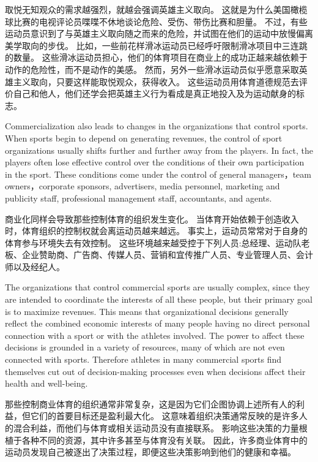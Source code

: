 \documentclass[cs4size, a4paper, 12pt]{article}
\newcounter{numpar}
\newcommand*{\newpar}{\numpar{}}
\begin{document}
	取悦无知观众的需求越强烈，就越会强调英雄主义取向。 这就是为什么美国橄榄球比赛的电视评论员喋喋不休地谈论危险、受伤、带伤比赛和胆量。 不过，有些运动员意识到了与英雄主义取向随之而来的危险，并试图在他们的运动中放慢偏离美学取向的步伐。 比如，一些前花样滑冰运动员已经呼吁限制滑冰项目中三连跳的数量。 这些滑冰运动员担心，他们的体育项目在商业上的成功正越来越依赖于动作的危险性，而不是动作的美感。 然而，另外一些滑冰运动员似乎愿意采取英雄主义取向，只要这样能取悦观众，获得收入。 这些运动员用体育道德规范去评价自己和他人，他们还学会把英雄主义行为看成是真正地投入及为运动献身的标志。 
	
	\newpar Commercialization also leads to changes in the organizations that control sports. When sports begin to depend on generating revenues, the control of sport organizations usually shifts further and further away from the players. In fact, the players often lose effective control over the conditions of their own participation in the sport. These conditions come under the control of general managers，team owners，corporate sponsors, advertisers, media personnel, marketing and publicity staff, professional management staff, accountants, and agents.
	
	商业化同样会导致那些控制体育的组织发生变化。 当体育开始依赖于创造收入时，体育组织的控制权就会离运动员越来越远。 事实上，运动员常常对于自身的体育参与环境失去有效控制。 这些环境越来越受控于下列人员:总经理、运动队老板、企业赞助商、广告商、传媒人员、营销和宜传推广人员、专业管理人员、会计师以及经纪人。 
	
	\newpar The organizations that control commercial sports are usually complex, since they are intended to coordinate the interests of all these people, but their primary goal is to maximize revenues. This means that organizational decisions generally reflect the combined economic interests of many people having no direct personal connection with a sport or with the athletes involved. The power to affect these decisions is grounded in a variety of resources, many of which are not even connected with sports. Therefore athletes in many commercial sports find themselves cut out of decision-making processes even when decisions affect their health and well-being.
	
	那些控制商业体育的组织通常非常复杂，这是因为它们企图协调上述所有人的利益，但它们的首要目标还是盈利最大化。 这意味着组织决策通常反映的是许多人的混合利益，而他们与体育或相关运动员没有直接联系。 影响这些决策的力量根植于各种不同的资源，其中许多甚至与体育没有关联。 因此，许多商业体育中的运动员发现自己被逐出了决策过程，即便这些决策影响到他们的健康和幸福。 
	
\end{document}

